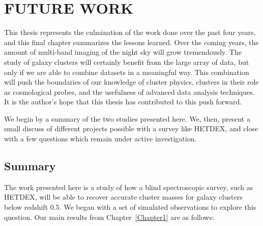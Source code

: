 %
%
%



\chapter[\uppercase{Future Work}]{\uppercase{Future Work}}

This thesis represents the culmination of the work done over the past four years, and this final chapter summarizes the lessons learned. Over the coming years, the amount of multi-band imaging of the night sky will grow tremendously. The study of galaxy clusters will certainly benefit from the large array of data, but only if we are able to combine datasets in a meaningful way. This combination will push the boundaries of our knowledge of cluster physics, clusters in their role as cosmological probes, and the usefulness of advanced data analysis techniques. It is the author's hope that this thesis has contributed to this push forward. 

We begin by a summary of the two studies presented here. We, then, present a small discuss of different projects possible with a survey like HETDEX, and close with a few questions which remain under active investigation.

\section{Summary} 
The work presented here is a study of how a blind spectroscopic survey, such as HETDEX, will be able to recover accurate cluster masses for galaxy clusters below redshift 0.5. We began with a set of simulated observations to explore this question. Our main results from Chapter~\ref{Chapter1} are as follows:

